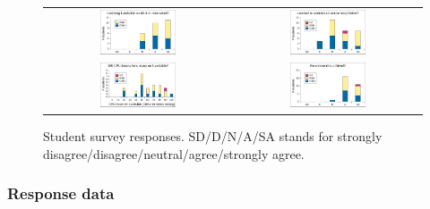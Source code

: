 \begin{figure}[p]
\begin{center}
\begin{tabular}{cc}
			\includegraphics[width=0.42\textwidth]{survey7.pdf} &
			\includegraphics[width=0.42\textwidth]{survey8.pdf} \\
			\includegraphics[width=0.42\textwidth]{survey9.pdf} &
			\includegraphics[width=0.42\textwidth]{survey10.pdf} \\
		\end{tabular}
	\end{center}
	\caption[Student survey responses.]
		{Student survey responses.
	SD/D/N/A/SA stands for
	strongly disagree/\allowbreak{}disagree/\allowbreak{}neutral/\allowbreak{}agree/\allowbreak{}strongly agree.}
	\label{fig:survey}
\end{figure}

\subsubsection{Response data}
\label{sec:education-survey-response-data}

